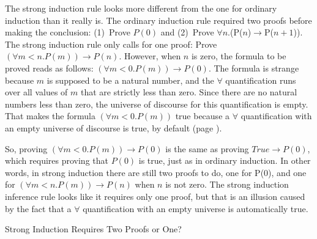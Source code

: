 \begin{aside}
The strong induction rule looks more different
from the one for ordinary induction than it really is.
The ordinary induction rule required two proofs before making the conclusion:
(1)~Prove $P(0)$ and (2)~Prove $\forall$$n$.(P($n$)$\rightarrow$P($n+1$)).
The strong induction rule only calls for one proof:
Prove $(\forall m<n.P(m))\rightarrow P(n)$.
However, when $n$ is zero, the formula to be proved reads as follows:
$(\forall m<0.P(m))\rightarrow P(0)$.
The formula is strange because $m$ is supposed to be a natural number,
and the $\forall$ quantification runs over
all values of $m$ that are strictly less than zero.
Since there are no natural numbers less than zero,
the universe of discourse for this quantification is empty.
That makes the formula $(\forall m<0.P(m))$ true because
a $\forall$ quantification with an empty universe of discourse is true, by default
(page \pageref{empty-forall}).

So, proving $(\forall m<0.P(m))\rightarrow P(0)$
is the same as proving $True \rightarrow P(0)$,
which requires proving that $P(0)$ is true, just
as in ordinary induction.
In other words, in strong induction there are still two proofs to do,
one for P(0), and one for $(\forall m<n.P(m))\rightarrow P(n)$
when $n$ is not zero.
The strong induction inference rule looks like it
requires only one proof, but that is an illusion
caused by the fact that a $\forall$ quantification with an empty universe
is automatically true.
\caption{Strong Induction Requires Two Proofs or One?}
\label{strong-induction-rule-2-hyps-or-1}
\end{aside}

